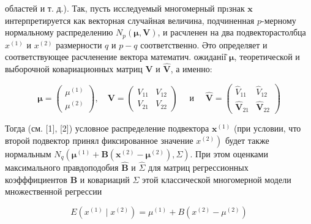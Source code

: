 \documentclass[10pt]{article}
\begin{document}
областей и т. д.). Так, пусть исследуемый многомерный прıзнак $\boldsymbol{x}$ интерпретируется как векторная случайная величина, подчиненная $p$-мерному нормальному распределению $N_{p}(\boldsymbol{\mu}, \boldsymbol{V})$, и расчленен на два подвекторастолбца $x^{(1)}$ и $x^{(2)}$ размерности $q$ и $p-q$ соответственно. Әто определяет и соответствующее расчленение вектора математич. ожиданії̈ $\boldsymbol{\mu}$, теоретической и выборочной ковариационных матриц $\boldsymbol{V}$ и $\hat{\boldsymbol{V}}$, а именно:



\[

\boldsymbol{\mu}=\left(\begin{array}{l}

\mu^{(1)} \\

\mu^{(2)}

\end{array}\right), \quad \boldsymbol{V}=\left(\begin{array}{ll}

V_{11} & V_{12} \\

V_{21} & V_{22}

\end{array}\right) \quad \text { и } \quad \hat{\boldsymbol{V}}=\left(\begin{array}{ll}

\widehat{V}_{11} & \hat{V}_{12} \\

\widehat{\boldsymbol{V}}_{21} & \hat{\boldsymbol{V}}_{22}

\end{array}\right)

\]



Тогда (см. [1], [2]) условное распределение подвектора $\boldsymbol{x}^{(1)}$ (при условии, что второй подвектор принял фиксированное значение $\left.x^{(2)}\right)$ будет также нормальным $N_{q}\left(\boldsymbol{\mu}^{(1)}+\boldsymbol{B}\left(\boldsymbol{x}^{(2)}-\boldsymbol{\mu}^{(2)}\right), \Sigma\right)$. При этом оценками максимального правдоподобия $\hat{\boldsymbol{B}}$ и $\hat{\Sigma}$ для матриц регрессионных коэфффициентов $\boldsymbol{B}$ и ковариаций $\Sigma$ этой классической многомерной модели множественной регрессии



\[

E\left(x^{(1)} \mid x^{(2)}\right)=\mu^{(1)}+B\left(x^{(2)}-\mu^{(2)}\right)

\]
\end{document}
